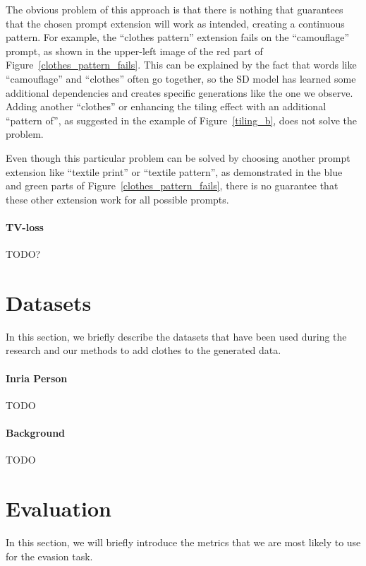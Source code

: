 The obvious problem of this approach is that there is nothing that guarantees that the chosen prompt extension will work as intended, creating a continuous pattern.
For example, the ``clothes pattern'' extension fails on the ``camouflage'' prompt, as shown in the upper-left image of the red part of  Figure~\ref{clothes_pattern_fails}.
This can be explained by the fact that words like ``camouflage'' and ``clothes'' often go together, so the SD model has learned some additional dependencies and creates specific generations like the one we observe.
Adding another ``clothes'' or enhancing the tiling effect with an additional ``pattern of'', as suggested in the example of Figure~\ref{tiling_b}, does not solve the problem.

Even though this particular problem can be solved by choosing another prompt extension like ``textile print'' or ``textile pattern'', as demonstrated in the blue and green parts of Figure~\ref{clothes_pattern_fails}, there is no guarantee that these other extension work for all possible prompts.

\paragraph{TV-loss}
TODO?

\section{Datasets}

In this section, we briefly describe the datasets that have been used during the research and our methods to add clothes to the generated data.

\paragraph{Inria Person}

TODO

\paragraph{Background}

TODO

\section{Evaluation}

In this section, we will briefly introduce the metrics that we are most likely to use for the evasion task.

